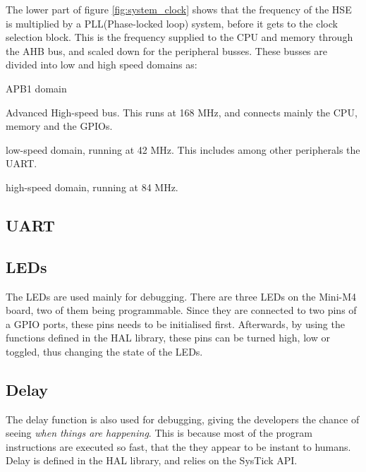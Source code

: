 The lower part of figure \ref{fig:system_clock} shows that the frequency
of the HSE is multiplied by a PLL(Phase-locked loop) system, before it gets
to the clock selection block. This is the frequency supplied to
the CPU and memory through the AHB bus, and scaled down for the peripheral busses. These busses are divided into low and high speed domains as:

\begin{labeling}{APB1 domain}
	\item[\textbf{AHB}]
		Advanced High-speed bus. This runs at 168 MHz, and connects
		mainly the CPU, memory and the GPIOs.
	\item[\textbf{APB1 domain}]
		low-speed domain, running at 42 MHz. This includes among other 
		peripherals the UART.		
	\item[\textbf{APB2 domain}]
		high-speed domain, running at 84 MHz.
	\end{labeling}

\subsection{UART}


\subsection{LEDs}
The LEDs are used mainly for debugging. There are three LEDs on the 
Mini-M4 board, two of them being programmable. Since they are connected
to two pins of a GPIO ports, these pins needs to be initialised first.
Afterwards, 
by using the functions defined in the HAL library, these pins can be 
turned high, low or toggled, thus changing the state of the LEDs.

\subsection{Delay}
\label{ssec:delay}
The delay function is also used for debugging, giving the developers the 
chance of seeing \textit{when things are happening}. This is because most of the
program instructions are executed so fast, that the they appear to be
instant to humans. 
Delay is defined in the HAL library, and relies on the SysTick API.

